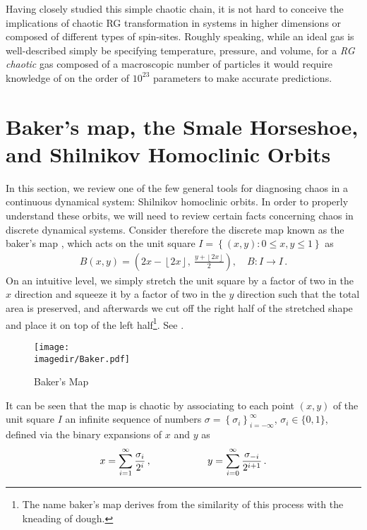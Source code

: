 Having closely studied this simple chaotic chain, it is not hard to conceive the implications of  chaotic RG transformation in systems in higher dimensions or composed of different types of spin-sites. Roughly speaking, while an ideal gas is well-described simply be specifying temperature, pressure, and volume, for a {\it RG chaotic} gas composed of a macroscopic number of particles it would require knowledge of on the order of $10^{23}$ parameters to make accurate predictions.



\section{Baker's map, the Smale Horseshoe, and Shilnikov Homoclinic Orbits}
\label{sec:Shilnikov}
In this section, we review one of the few general tools for diagnosing chaos in a continuous dynamical system: Shilnikov homoclinic orbits. In order to properly understand these orbits, we will need to review certain facts concerning chaos in discrete dynamical systems. Consider therefore the discrete map known as the baker's map \cite{hopf1937erg}, which acts on the unit square $I = \left\{(x,y): 0 \leq x,y \leq 1 \right\}$ as
\begin{gather}
B(x, y) =\left(2x - \left\lfloor 2x \right\rfloor,\ \frac{ y + \left\lfloor 2x\right\rfloor }{2}\right),\quad B:I \to I\,.
\end{gather}
On an intuitive level, we simply stretch the unit square by a factor of two in the $x$ direction and squeeze it by a factor of two in the $y$ direction such that the total area is preserved, and afterwards we cut off the right half of the stretched shape and place it on top of the left half\footnote{The name baker's map derives from the similarity of this process with the kneading of dough.}. See . 
\begin{figure}
    \centering
  \texttt{[image: \\imagedir/Baker.pdf]}
    \caption{Baker's Map}
    \label{fig:baker}
\end{figure}
It can be seen that the map is chaotic by associating to each point $(x,y)$ of the unit square $I$ an infinite sequence of numbers $\sigma =\left\{ \sigma_i \right\}^\infty_{i=-\infty}$, $\sigma_i \in \{0,1\}$, defined via the binary expansions of $x$ and $y$ as
\begin{gather}
x = \sum\limits^\infty_{i=1} \frac{\sigma_i}{2^{i}}\,,
\hspace{20mm}
y= \sum\limits_{i=0}^{\infty} \frac{\sigma_{-i}}{2^{i+1}}\,.
\end{gather}
